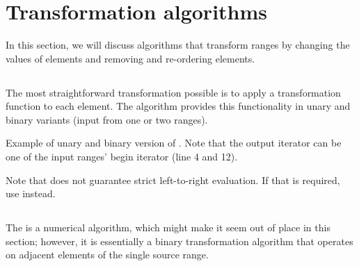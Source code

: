 \section{Transformation algorithms}

In this section, we will discuss algorithms that transform ranges by changing the values of elements and removing and re-ordering elements.

\subsection{\texorpdfstring{}{\texttt{std::transform}}}

The most straightforward transformation possible is to apply a transformation function to each element. The  algorithm provides this functionality in unary and binary variants (input from one or two ranges).




\begin{box-note}
\footnotesize Example of unary and binary version of . Note that the output iterator can be one of the input ranges' begin iterator (line 4 and 12).
\tcblower
{}
\end{box-note}

Note that  does not guarantee strict left-to-right evaluation. If that is required, use  instead.

\subsection{\texorpdfstring{}{\texttt{std::adjacent\_difference}}}

The  is a numerical algorithm, which might make it seem out of place in this section; however, it is essentially a binary transformation algorithm that operates on adjacent elements of the single source range.

